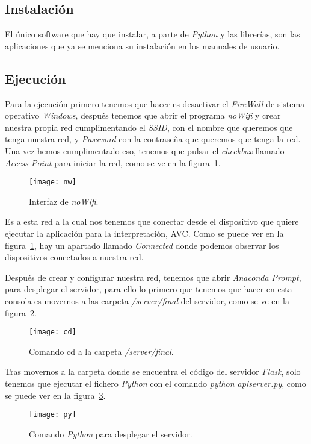 \subsection{Instalación}
El único software que hay que instalar, a parte de \textit{Python} y las librerías, son las aplicaciones que ya se menciona su instalación en los manuales de usuario.

\subsection{Ejecución}
Para la ejecución primero tenemos que hacer es desactivar el \textit{FireWall} de sistema operativo \textit{Windows}, después tenemos que abrir el programa \textit{noWifi} y crear nuestra propia red cumplimentando el \textit{SSID}, con el nombre que queremos que tenga nuestra red, y \textit{Password} con la contraseña que queremos que tenga la red. Una vez hemos cumplimentado eso, tenemos que pulsar el \textit{checkbox} llamado \textit{Access Point} para iniciar la red, como se ve en la figura~\ref{fig:nw}.

\begin{figure}
	\centering
	\texttt{[image: nw]}
	\caption{Interfaz de \textit{noWifi}.}
	\label{fig:nw}
\end{figure}

Es a esta red a la cual nos tenemos que conectar desde el dispositivo que quiere ejecutar la aplicación para la interpretación, AVC. Como se puede ver en la figura~\ref{fig:nw}, hay un apartado llamado \textit{Connected} donde podemos observar los dispositivos conectados a nuestra red.

Después de crear y configurar nuestra red, tenemos que abrir \textit{Anaconda Prompt}, para desplegar el servidor, para ello lo primero que tenemos que hacer en esta consola es movernos a las carpeta \textit{/server/final} del servidor, como se ve en la figura~\ref{fig:cd}.

\begin{figure}
	\centering
	\texttt{[image: cd]}
	\caption{Comando cd a la carpeta \textit{/server/final}.}
	\label{fig:cd}
\end{figure}

Tras movernos a la carpeta donde se encuentra el código del servidor \textit{Flask}, solo tenemos que ejecutar el fichero \textit{Python} con el comando \textit{python apiserver.py}, como se puede ver en la figura~\ref{fig:py}.

\begin{figure}
	\centering
	\texttt{[image: py]}
	\caption{Comando \textit{Python} para desplegar el servidor.}
	\label{fig:py}
\end{figure}

